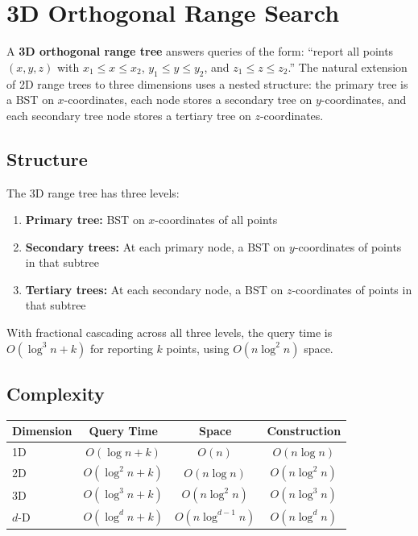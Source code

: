 
\section{3D Orthogonal Range Search}
\label{sec:3d-range}

A \textbf{3D orthogonal range tree} answers queries of the form: ``report all points $(x, y, z)$ with $x_1 \le x \le x_2$, $y_1 \le y \le y_2$, and $z_1 \le z \le z_2$.'' The natural extension of 2D range trees to three dimensions uses a nested structure: the primary tree is a BST on $x$-coordinates, each node stores a secondary tree on $y$-coordinates, and each secondary tree node stores a tertiary tree on $z$-coordinates.

\subsection{Structure}

The 3D range tree has three levels:
\begin{enumerate}
    \item \textbf{Primary tree:} BST on $x$-coordinates of all points
    \item \textbf{Secondary trees:} At each primary node, a BST on $y$-coordinates of points in that subtree
    \item \textbf{Tertiary trees:} At each secondary node, a BST on $z$-coordinates of points in that subtree
\end{enumerate}

With fractional cascading across all three levels, the query time is $O(\log^3 n + k)$ for reporting $k$ points, using $O(n \log^2 n)$ space.

\subsection{Complexity}

\begin{center}
\begin{tabular}{lccc}
\toprule
Dimension & Query Time & Space & Construction \\
\midrule
1D & $O(\log n + k)$ & $O(n)$ & $O(n \log n)$ \\
2D & $O(\log^2 n + k)$ & $O(n \log n)$ & $O(n \log^2 n)$ \\
3D & $O(\log^3 n + k)$ & $O(n \log^2 n)$ & $O(n \log^3 n)$ \\
$d$-D & $O(\log^d n + k)$ & $O(n \log^{d-1} n)$ & $O(n \log^{d} n)$ \\
\bottomrule
\end{tabular}
\end{center}

